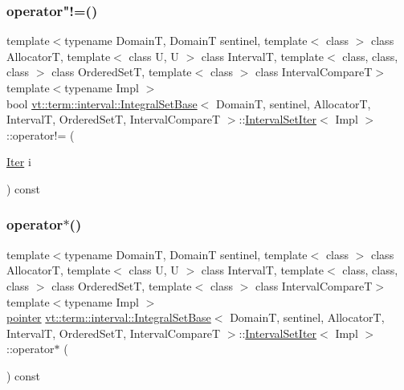 \subsubsection{\texorpdfstring{operator"!=()}{operator!=()}}
{\footnotesize\ttfamily template$<$typename DomainT, DomainT sentinel, template$<$ class $>$ class AllocatorT, template$<$ class U, U $>$ class IntervalT, template$<$ class, class, class $>$ class Ordered\+SetT, template$<$ class $>$ class Interval\+CompareT$>$ \\
template$<$typename Impl $>$ \\
bool \hyperlink{structvt_1_1term_1_1interval_1_1_integral_set_base}{vt\+::term\+::interval\+::\+Integral\+Set\+Base}$<$ DomainT, sentinel, AllocatorT, IntervalT, Ordered\+SetT, Interval\+CompareT $>$\+::\hyperlink{structvt_1_1term_1_1interval_1_1_integral_set_base_1_1_interval_set_iter}{Interval\+Set\+Iter}$<$ Impl $>$\+::operator!= (\begin{DoxyParamCaption}\item[{\hyperlink{structvt_1_1term_1_1interval_1_1_integral_set_base_1_1_interval_set_iter_a4056b2dcca9f60143d2d76387599e6e1}{Iter}}]{i }\end{DoxyParamCaption}) const\hspace{0.3cm}{\ttfamily [inline]}}

\mbox{\label{structvt_1_1term_1_1interval_1_1_integral_set_base_1_1_interval_set_iter_a408e2c002ef293e57d09804734e640c7}} 
\subsubsection{\texorpdfstring{operator$\ast$()}{operator*()}}
{\footnotesize\ttfamily template$<$typename DomainT, DomainT sentinel, template$<$ class $>$ class AllocatorT, template$<$ class U, U $>$ class IntervalT, template$<$ class, class, class $>$ class Ordered\+SetT, template$<$ class $>$ class Interval\+CompareT$>$ \\
template$<$typename Impl $>$ \\
\hyperlink{structvt_1_1term_1_1interval_1_1_integral_set_base_1_1_interval_set_iter_a9da8b4820369a4e830f6ca596e08270c}{pointer} \hyperlink{structvt_1_1term_1_1interval_1_1_integral_set_base}{vt\+::term\+::interval\+::\+Integral\+Set\+Base}$<$ DomainT, sentinel, AllocatorT, IntervalT, Ordered\+SetT, Interval\+CompareT $>$\+::\hyperlink{structvt_1_1term_1_1interval_1_1_integral_set_base_1_1_interval_set_iter}{Interval\+Set\+Iter}$<$ Impl $>$\+::operator$\ast$ (\begin{DoxyParamCaption}{ }\end{DoxyParamCaption}) const\hspace{0.3cm}{\ttfamily [inline]}}

